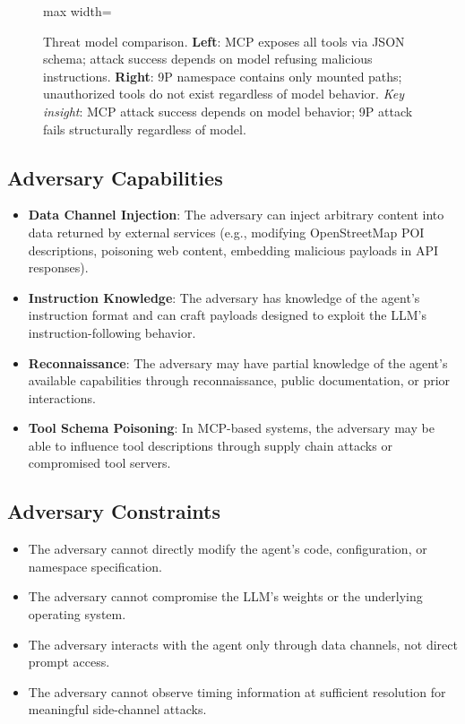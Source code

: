\documentclass{article}
\begin{document}
\begin{figure}[t]
\begin{adjustbox}{max width=\linewidth}
\begin{tikzpicture}
\end{tikzpicture}
\end{adjustbox}
\caption{Threat model comparison. \textbf{Left}: MCP exposes all tools via JSON schema; attack success depends on model refusing malicious instructions. \textbf{Right}: 9P namespace contains only mounted paths; unauthorized tools do not exist regardless of model behavior. \textit{Key insight}: MCP attack success depends on model behavior; 9P attack fails structurally regardless of model.}
\label{fig:threat-model}
\end{figure}

\subsection{Adversary Capabilities}

\begin{itemize}
    \item \textbf{Data Channel Injection}: The adversary can inject arbitrary content into data returned by external services (e.g., modifying OpenStreetMap POI descriptions, poisoning web content, embedding malicious payloads in API responses).
    \item \textbf{Instruction Knowledge}: The adversary has knowledge of the agent's instruction format and can craft payloads designed to exploit the LLM's instruction-following behavior.
    \item \textbf{Reconnaissance}: The adversary may have partial knowledge of the agent's available capabilities through reconnaissance, public documentation, or prior interactions.
    \item \textbf{Tool Schema Poisoning}: In MCP-based systems, the adversary may be able to influence tool descriptions through supply chain attacks or compromised tool servers.
\end{itemize}

\subsection{Adversary Constraints}

\begin{itemize}
    \item The adversary cannot directly modify the agent's code, configuration, or namespace specification.
    \item The adversary cannot compromise the LLM's weights or the underlying operating system.
    \item The adversary interacts with the agent only through data channels, not direct prompt access.
    \item The adversary cannot observe timing information at sufficient resolution for meaningful side-channel attacks.
\end{itemize}
\end{document}
